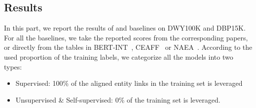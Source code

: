 




\subsection{Results}

In this part, we report the results of \solution and baselines on DWY100K and DBP15K. For all the baselines, we take the reported scores from the corresponding papers, or directly from the tables in BERT-INT~\cite{tang2019bert-int}, CEAFF~\cite{CEAFF} or NAEA~\cite{zhu2019neighborhood}. According to the used proportion of the training labels, we categorize all the models into two types:
\begin{itemize}
    \item Supervised: 100\% of the aligned entity links in the training set is leveraged
    \item Unsupervised \& Self-supervised: 0\% of the training set is leveraged.
\end{itemize}





